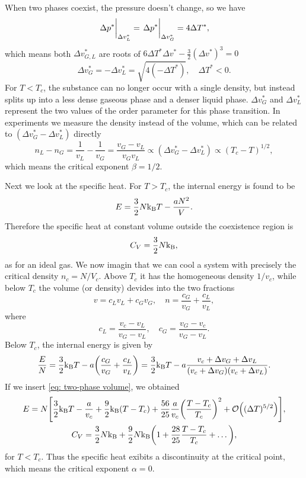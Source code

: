 \documentclass[10pt]{article}
\begin{document}
	When two phases coexist, the pressure doesn't change, so we have
	\begin{equation}
		\eval{\Delta p^*}_{\Delta v^*_L} = \eval{\Delta p^*}_{\Delta v^*_G} = 4 \Delta T^*,
	\end{equation}
	which means both $\Delta v^*_{G,L}$ are roots of $6 \Delta T^* \Delta v^* - \tfrac{3}{2} (\Delta v^*)^3 = 0$
	\begin{equation}
		\Delta v^*_{G} = -\Delta v^*_{L} = \sqrt{4(-\Delta T^*)}, \quad \Delta T^* < 0. \label{eq: two-phase volume}
	\end{equation}
	For $T < T_c$, the substance can no longer occur with a single density, but instead splits up into a less dense gaseous phase and a denser liquid phase. $\Delta v^*_{G}$ and $\Delta v^*_{L}$ represent the two values of the order parameter for this phase transition. In experiments we measure the density instead of the volume, which can be related to $(\Delta v^*_{G} - \Delta v^*_{L})$ directly
	\begin{equation}
		n_L - n_G = \frac{1}{v_L} - \frac{1}{v_G} = \frac{v_G - v_L}{v_G v_L} \propto (\Delta v^*_G - \Delta v^*_L) \propto (T_c - T)^{1/2},
	\end{equation}
	which means the critical exponent $\beta = 1/2$.

	Next we look at the specific heat. For $T > T_c$, the internal energy is found to be
	\begin{equation}
		E = \frac{3}{2}N {\mathrm{k_B}} T - \frac{aN^2}{V}.
	\end{equation}
	Therefore the specific heat at constant volume outside the coexistence region is
	\begin{equation}
		C_V = \frac{3}{2}N{\mathrm{k_B}},
	\end{equation}
	as for an ideal gas. We now imagin that we can cool a system with precisely the critical density $n_c = N/V_c$. Above $T_c$ it has the homogeneous density $1/v_c$, while below $T_c$ the volume (or density) devides into the two fractions
	\begin{equation}
		v = c_L v_L + c_G v_G, \quad n = \frac{c_G}{v_G} + \frac{c_L}{v_L},
	\end{equation}
	where
	\begin{equation}
		c_L = \frac{v_c - v_L}{v_G - v_L}, \quad c_G = \frac{v_G - v_c}{v_G - v_L}.
	\end{equation}
	Below $T_c$, the internal energy is given by
	\begin{equation}
		\frac{E}{N} = \frac{3}{2}{\mathrm{k_B}} T - a\qty(\frac{c_G}{v_G} + \frac{c_L}{v_L}) = \frac{3}{2}{\mathrm{k_B}} T - a \frac{v_c + \Delta v_G + \Delta v_L}{(v_c + \Delta v_G)(v_c + \Delta v_L)}.
	\end{equation}
	If we insert \eqref{eq: two-phase volume}, we obtained
	\begin{gather}
		E = N\qty[\frac{3}{2}\kb T - \frac{a}{v_c} + \frac{9}{2}\kb (T - T_c) + \frac{56}{25}\frac{a}{v_c} \qty(\frac{T - T_c}{T_c})^2 + \order{(\Delta T)^{5/2}}], \\
		C_V = \frac{3}{2}N \kb + \frac{9}{2}N \kb \qty(1 + \frac{28}{25} \frac{T - T_c}{T_c} + \dots),
	\end{gather}
	for $T < T_c$. Thus the specific heat exibits a discontinuity at the critical point, which means the critical exponent $\alpha = 0$.
\end{document}

